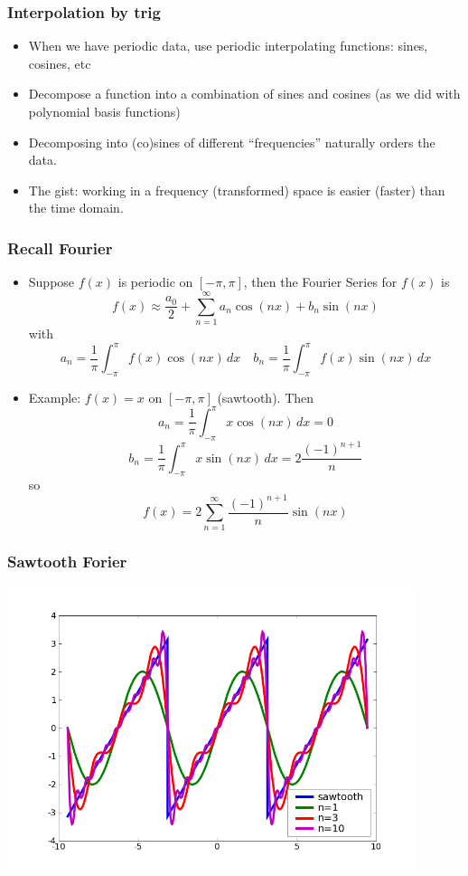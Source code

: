 \documentclass[10pt]{beamer}
\begin{document}
\begin{frame}
\frametitle{Interpolation by trig}
\begin{itemize}
  \item When we have periodic data, use periodic interpolating functions: sines,
cosines, etc
\bigskip

  \item Decompose a function into a combination of sines and cosines (as we did
with polynomial basis functions)
\bigskip

  \item Decomposing into (co)sines of different ``frequencies'' naturally orders
the data.
\bigskip

  \item The gist: working in a frequency (transformed) space is easier (faster)
than the time domain.
\end{itemize}
\end{frame}

\begin{frame}
  \frametitle{Recall Fourier}
  \begin{itemize}
  \item Suppose $f(x)$ is periodic on $[-\pi,\pi]$, then the Fourier Series for
$f(x)$ is
\[
  f(x) \approx \frac{a_0}{2} + \sum_{n=1}^{\infty} a_n \cos(nx) + b_n \sin(nx)
\]
with
\[
  a_n = \frac{1}{\pi} \int_{-\pi}^{\pi} f(x) \cos(nx)\, dx \quad
  b_n = \frac{1}{\pi} \int_{-\pi}^{\pi} f(x) \sin(nx)\, dx
\]
  \item Example: $f(x) = x$ on $[-\pi,\pi]$ (sawtooth).  Then
\[
  a_n = \frac{1}{\pi} \int_{-\pi}^{\pi} x \cos(nx)\, dx  = 0
\]
\[
  b_n = \frac{1}{\pi} \int_{-\pi}^{\pi} x \sin(nx)\, dx = 2 \frac{(-1)^{n+1}}{n}
\]
so
\[
  f(x) = 2\sum_{n=1}^{\infty} \frac{(-1)^{n+1}}{n} \sin(nx)
\]
  \end{itemize}
\end{frame}
\begin{frame}
\frametitle{Sawtooth Forier}
\begin{center}
  \includegraphics[width=12cm]{./figs/sawtooth}
\end{center}
\end{frame}
\end{document}
